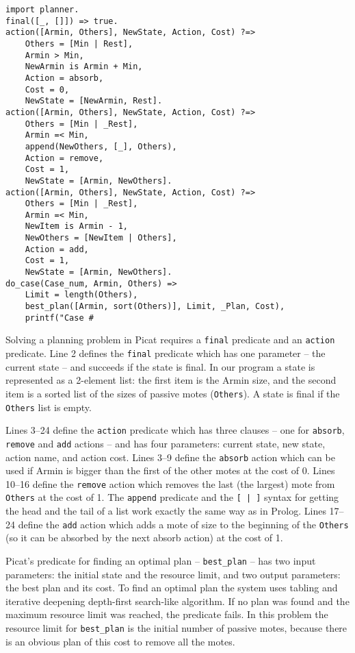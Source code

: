 \documentclass{llncs}
\begin{document}
\begin{lstlisting}[caption={Picat solution for the ``Osmos'' problem}]
import planner.
final([_, []]) => true.
action([Armin, Others], NewState, Action, Cost) ?=>
    Others = [Min | Rest],
    Armin > Min,
    NewArmin is Armin + Min,
    Action = absorb,
    Cost = 0,
    NewState = [NewArmin, Rest].
action([Armin, Others], NewState, Action, Cost) ?=>
    Others = [Min | _Rest],
    Armin =< Min,
    append(NewOthers, [_], Others),
    Action = remove,
    Cost = 1,
    NewState = [Armin, NewOthers].
action([Armin, Others], NewState, Action, Cost) ?=>
    Others = [Min | _Rest],
    Armin =< Min,
    NewItem is Armin - 1,
    NewOthers = [NewItem | Others],
    Action = add,
    Cost = 1,
    NewState = [Armin, NewOthers].
do_case(Case_num, Armin, Others) =>
    Limit = length(Others),
    best_plan([Armin, sort(Others)], Limit, _Plan, Cost),
    printf("Case #\end{lstlisting}

Solving a planning problem in Picat requires a \texttt{final} predicate and an \texttt{action} predicate.
Line 2 defines the \texttt{final} predicate which has one parameter -- the current state -- and succeeds if the state is final.
In our program a state is represented as a 2-element list: the first item is the Armin size, and the second item is a sorted list of the sizes of passive motes (\texttt{Others}). A state is final if the \texttt{Others} list is empty.

Lines 3--24 define the \texttt{action} predicate which has three clauses -- one for \texttt{absorb}, \texttt{remove} and \texttt{add} actions -- and has four parameters: current state, new state, action name, and action cost.
Lines 3--9 define the \texttt{absorb} action which can be used if Armin is bigger than the first of the other motes at the cost of 0.
Lines 10--16 define the \texttt{remove} action which removes the last (the largest) mote from \texttt{Others} at the cost of 1.
The \texttt{append} predicate and the \texttt{[ | ]} syntax for getting the head and the tail of a list work exactly the same way as in Prolog.
Lines 17--24 define the \texttt{add} action which adds a mote of size  to the beginning of the \texttt{Others}
(so it can be absorbed by the next absorb action) at the cost of 1.

Picat's predicate for finding an optimal plan -- \texttt{best\_plan} -- has two input parameters: the initial state and the resource limit, and two output parameters: the best plan and its cost. To find an optimal plan the system uses tabling and iterative deepening depth-first search-like algorithm. If no plan was found and the maximum resource limit was reached, the predicate fails.
In this problem the resource limit for \texttt{best\_plan} is the initial number of passive motes, because there is an obvious plan of this cost to remove all the motes.
\end{document}

